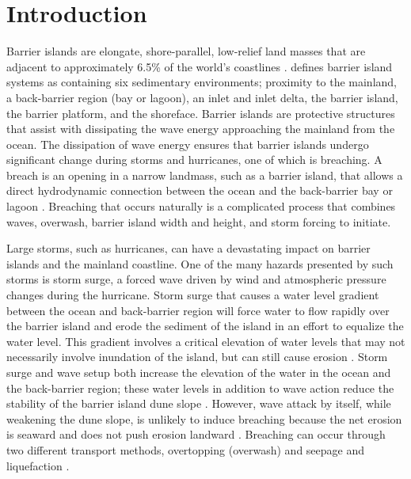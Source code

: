 \documentclass{coastal_paper}
\begin{document}
\section{Introduction}
Barrier islands are elongate, shore-parallel, low-relief land masses that are adjacent to approximately 6.5\% of the world's coastlines \citep{Oertel1985TheSystem,Stutz2001ADistribution}. \citet{Oertel1985TheSystem} defines barrier island systems as containing six sedimentary environments; proximity to the mainland, a back-barrier region (bay or lagoon), an inlet and inlet delta, the barrier island, the barrier platform, and the shoreface. Barrier islands are protective structures that assist with dissipating the wave energy approaching the mainland from the ocean. The dissipation of wave energy ensures that barrier islands undergo significant change during storms and hurricanes, one of which is breaching. A breach is an opening in a narrow landmass, such as a barrier island, that allows a direct hydrodynamic connection between the ocean and the back-barrier bay or lagoon \citep{Kraus2003, Kraus2003a, Wamsley2005CoastalClosure, KRAUS2005}. Breaching that occurs naturally is a complicated process that combines waves, overwash, barrier island width and height, and storm forcing to initiate. 

Large storms, such as hurricanes, can have a devastating impact on barrier islands and the mainland coastline. One of the many hazards presented by such storms is storm surge, a forced wave driven by wind and atmospheric pressure changes during the hurricane. Storm surge that causes a water level gradient between the ocean and back-barrier region will force water to flow rapidly over the barrier island and erode the sediment of the island in an effort to equalize the water level. This gradient involves a critical elevation of water levels that may not necessarily involve inundation of the island, but can still cause erosion \citep{Kraus2002, Kraus2003}. Storm surge and wave setup both increase the elevation of the water in the ocean and the back-barrier region; these water levels in addition to wave action reduce the stability of the barrier island dune slope \citep{Kraus2003, Kraus2002}. However, wave attack by itself, while weakening the dune slope, is unlikely to induce breaching because the net erosion is seaward and does not push erosion landward \citep{Pierce1970}. Breaching can occur through two different transport methods, overtopping (overwash) and seepage and liquefaction \citep{Kraus2002, Kraus2003}.
\end{document}
